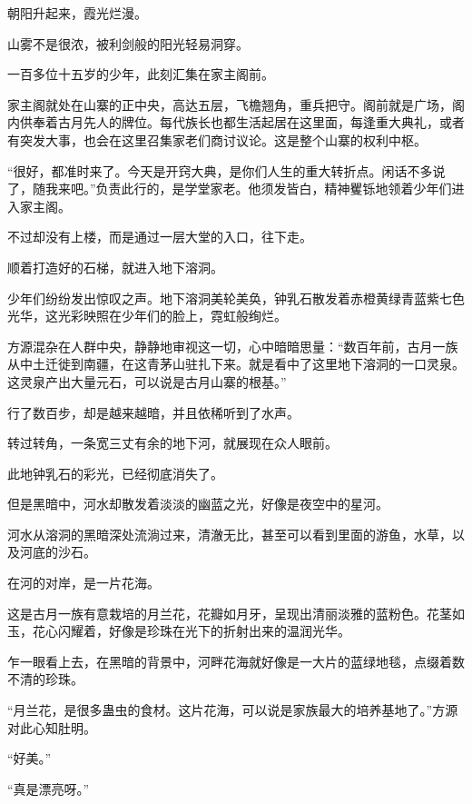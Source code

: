
\begin{this_body}



朝阳升起来，霞光烂漫。

山雾不是很浓，被利剑般的阳光轻易洞穿。

一百多位十五岁的少年，此刻汇集在家主阁前。

家主阁就处在山寨的正中央，高达五层，飞檐翘角，重兵把守。阁前就是广场，阁内供奉着古月先人的牌位。每代族长也都生活起居在这里面，每逢重大典礼，或者有突发大事，也会在这里召集家老们商讨议论。这是整个山寨的权利中枢。

“很好，都准时来了。今天是开窍大典，是你们人生的重大转折点。闲话不多说了，随我来吧。”负责此行的，是学堂家老。他须发皆白，精神矍铄地领着少年们进入家主阁。

不过却没有上楼，而是通过一层大堂的入口，往下走。

顺着打造好的石梯，就进入地下溶洞。

少年们纷纷发出惊叹之声。地下溶洞美轮美奂，钟乳石散发着赤橙黄绿青蓝紫七色光华，这光彩映照在少年们的脸上，霓虹般绚烂。

方源混杂在人群中央，静静地审视这一切，心中暗暗思量：“数百年前，古月一族从中土迁徙到南疆，在这青茅山驻扎下来。就是看中了这里地下溶洞的一口灵泉。这灵泉产出大量元石，可以说是古月山寨的根基。”

行了数百步，却是越来越暗，并且依稀听到了水声。

转过转角，一条宽三丈有余的地下河，就展现在众人眼前。

此地钟乳石的彩光，已经彻底消失了。

但是黑暗中，河水却散发着淡淡的幽蓝之光，好像是夜空中的星河。

河水从溶洞的黑暗深处流淌过来，清澈无比，甚至可以看到里面的游鱼，水草，以及河底的沙石。

在河的对岸，是一片花海。

这是古月一族有意栽培的月兰花，花瓣如月牙，呈现出清丽淡雅的蓝粉色。花茎如玉，花心闪耀着，好像是珍珠在光下的折射出来的温润光华。

乍一眼看上去，在黑暗的背景中，河畔花海就好像是一大片的蓝绿地毯，点缀着数不清的珍珠。

“月兰花，是很多蛊虫的食材。这片花海，可以说是家族最大的培养基地了。”方源对此心知肚明。

“好美。”

“真是漂亮呀。”


\end{this_body}
